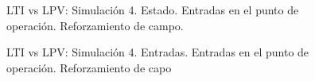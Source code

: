 \documentclass[a4paper, 10pt, onecolumn,journal]{ieeeconf}
\begin{document}
\begin{figure}[H]
	\centering
	\begin{adjustbox}{max width=\columnwidth}
	\end{adjustbox}
	\caption{LTI vs LPV: Simulación 4. Estado. Entradas en el punto de operación. Reforzamiento de campo.}
	\label{simulación 4 estado}
\end{figure}

\begin{figure}[H]
	\centering
	\begin{adjustbox}{scale=0.7,max width=\columnwidth}
	\end{adjustbox}
	\caption{LTI vs LPV: Simulación 4. Entradas. Entradas en el punto de operación. Reforzamiento de capo}
	\label{simulación 4 entradas}
\end{figure}
\end{document}
